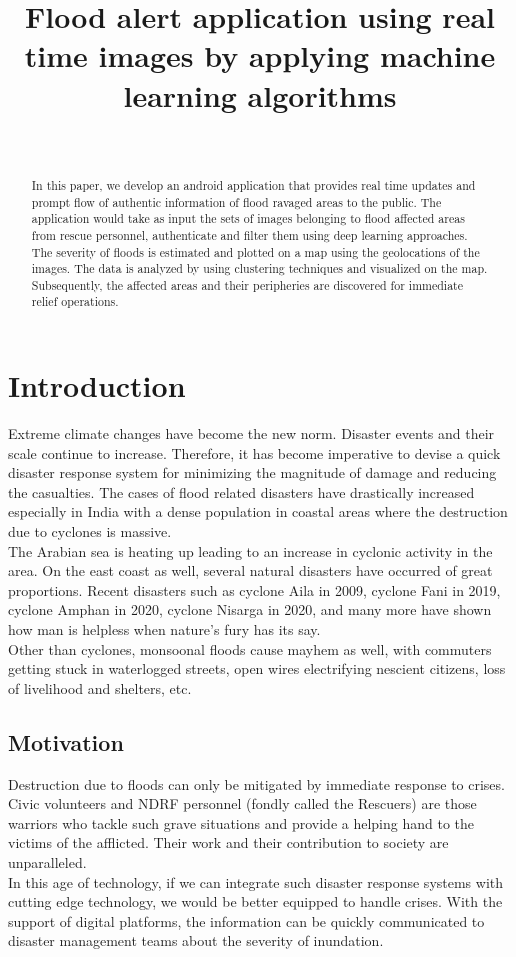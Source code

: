 \documentclass{IEEEtran}
\title{Flood alert application using real time images by applying machine learning algorithms}
\author{\IEEEauthorblockN{Name, Name}\\
\IEEEauthorblockA{Dept. of Computer Science \& Technology, Indian Institute of Engineering Science \& Technology, Shibpur, Howrah, India\\
Email: anonymous1@gmail.com, anonymous2@gmail.com}}
\begin{document}
\maketitle
\begin{abstract}
In this paper, we develop an android application that provides real time updates and prompt flow of authentic information of flood ravaged areas to the public. The application would take as input the sets of images belonging to flood affected areas from rescue personnel, authenticate and filter them using deep learning approaches. The severity of floods is estimated and plotted on a map using the geolocations of the images. The data is analyzed by using clustering techniques and visualized on the map. Subsequently, the affected areas and their peripheries are discovered for immediate relief operations.
\end{abstract}
\section{Introduction}
Extreme climate changes have become the new norm. Disaster events and their scale continue to increase. Therefore, it has become imperative to devise a quick disaster response system for minimizing the magnitude of damage and reducing the casualties. The cases of flood related disasters have drastically increased especially in India with a dense population in coastal areas where the destruction due to cyclones is massive.\\
The Arabian sea is heating up leading to an increase in cyclonic activity in the area. On the east coast as well, several natural disasters have occurred of great proportions. Recent disasters such as cyclone Aila in 2009, cyclone Fani in 2019, cyclone Amphan in 2020, cyclone Nisarga in 2020, and many more have shown how man is helpless when nature’s fury has its say.\\
Other than cyclones, monsoonal floods cause mayhem as well, with commuters getting stuck in waterlogged streets, open wires electrifying nescient citizens, loss of livelihood and shelters, etc.
\subsection{Motivation}
Destruction due to floods can only be mitigated by immediate response to crises.\\
Civic volunteers and NDRF personnel (fondly called the Rescuers) are those warriors who tackle such grave situations and provide a helping hand to the victims of the afflicted. Their work and their contribution to society are unparalleled.\\
In this age of technology, if we can integrate such disaster response systems with cutting edge technology, we would be better equipped to handle crises. With the support of digital platforms, the information can be quickly communicated to disaster management teams about the severity of inundation.
\end{document}
